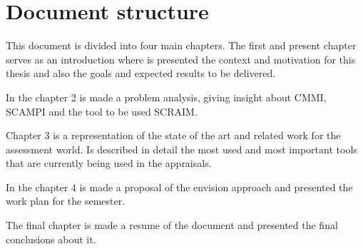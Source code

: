 \section{Document structure} \label{sec:Structure}

This document is divided into four main chapters. The first and present chapter serves as an introduction where is presented the context and motivation for this thesis and also the goals and expected results to be delivered.

In the chapter 2 is made a problem analysis, giving insight about CMMI, SCAMPI and the tool to be used SCRAIM.

Chapter 3 is a representation of the state of the art and related work for the assessment world. Is described in detail the most used and most important tools that are currently being used in the appraisals.

In the chapter 4 is made a proposal of the envision approach and presented the work plan for the semester.

The final chapter is made a resume of the document and presented the final conclusions about it.